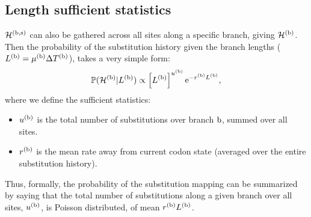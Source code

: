 \subsection{Length sufficient statistics}
$\mathcal{H}^{(\text{b}, \text{s})}$ can also be gathered across all sites along a specific branch, giving $\mathcal{H}^{(\text{b})}$.
Then the probability of the substitution history given the branch lengths ($L^{(\text{b})} = \mu^{(\text{b})} \Delta T^{(\text{b})}$), takes a very simple form:
\begin{equation}
    \label{eq:LengthSuffStat}
    \mathbb{P} (\mathcal{H}^{(\text{b})} | L^{(\text{b})}) \propto \left[ L^{(\text{b})}\right]^{u^{(\text{b})}} \text{e}^{- r^{(\text{b})} L^{(\text{b})}},
\end{equation}
where we define the sufficient statistics:
\begin{itemize}
    \setlength\itemsep{-0.25em}
    \item $u^{(\text{b})}$ is the total number of substitutions over branch $\text{b}$, summed over all sites.
    \item $r^{(\text{b})}$ is the mean rate away from current codon state (averaged over the entire substitution history).
\end{itemize}
Thus, formally, the probability of the substitution mapping can be summarized by saying that the total number of substitutions along a given branch over all sites, $u^{(\text{b})}$, is Poisson distributed, of mean $r^{(\text{b})} L^{(\text{b})}$.

